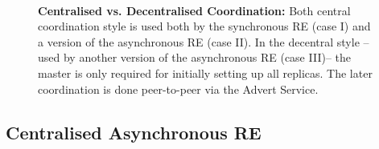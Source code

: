 \documentclass{rspublic}
\newcommand{\athotanote}[1]{ {\textcolor{green} { ***athota: #1 }}}
\newcommand{\athotanote}[1]{}
\begin{document}

\begin{figure}%
\centering
{}\qquad
{}\\
\caption{\textbf{Centralised vs. Decentralised Coordination:} Both central coordination style
is used both by the synchronous RE (case I) and a version of the asynchronous RE (case II). 
In the decentral style -- used by another version of the asynchronous RE (case III)-- the master is only required
for initially setting up all replicas. The later coordination is done peer-to-peer via the Advert Service.}
\label{fig:coordination}
\end{figure}


\subsection{Centralised Asynchronous RE}


\end{document}
